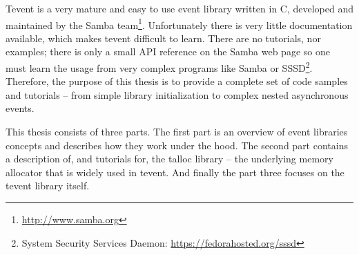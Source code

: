 Tevent is a very mature and easy to use event library written in C, developed
and maintained by the Samba team\footnote{\url{http://www.samba.org}}.
Unfortunately there is very little documentation available, which makes tevent
difficult to learn. There are no tutorials, nor examples; there is only a small
API reference on the Samba web page so one must learn the usage from very
complex programs like Samba or SSSD\footnote{System Security Services Daemon:
\url{https://fedorahosted.org/sssd}}. Therefore, the purpose of this thesis is
to provide a complete set of code samples and tutorials – from simple library
initialization to complex nested asynchronous events.

This thesis consists of three parts. The first part is an overview of event
libraries concepts and describes how they work under the hood. The second part
contains a description of, and tutorials for, the talloc library – the
underlying memory allocator that is widely used in tevent. And finally the part
three focuses on the tevent library itself.